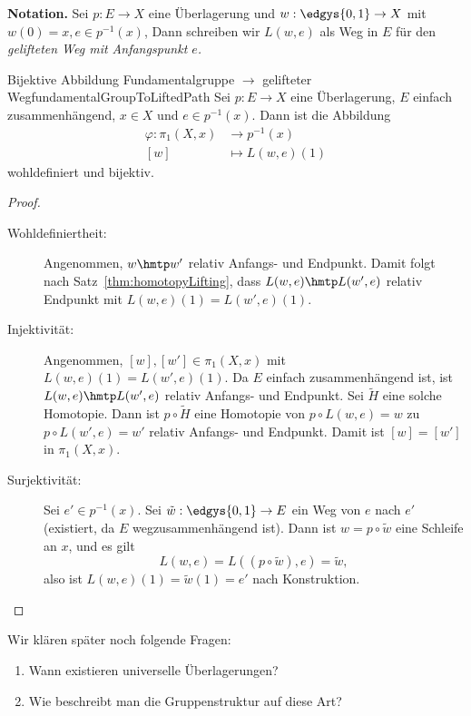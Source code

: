 \documentclass[language=ngerman]{TemplateLecture} %
\begin{document}
\textbf{Notation.} Sei $p: E \to X$ eine Überlagerung und $w: \edgys{0,1} \to X$ mit $w(0) = x, e \in p^{-1}(x)$, Dann schreiben wir $L(w,e)$ als Weg in $E$ für den \emph{gelifteten Weg mit Anfangspunkt $e$.}

\begin{thm}{Bijektive Abbildung Fundamentalgruppe $\to$ gelifteter Weg}{fundamentalGroupToLiftedPath}
    Sei $p: E \to X$ eine Überlagerung, $E$ einfach zusammenhängend, $x \in X$ und $e \in p^{-1}(x)$. Dann ist die Abbildung
    \begin{align*}
        \varphi: \pi_1(X,x) &\longrightarrow p^{-1}(x) \\
        [w] &\longmapsto L(w,e)(1)
    \end{align*}
    wohldefiniert und bijektiv.
\end{thm}

\begin{proof}
    \begin{description}
        \item[Wohldefiniertheit:] Angenommen, $w \hmtp w'$ relativ Anfangs- und Endpunkt. Damit folgt nach Satz~\ref{thm:homotopyLifting}, dass $L(w,e) \hmtp L(w', e)$ relativ Endpunkt mit $L(w,e)(1) = L(w',e)(1)$.
        \item[Injektivität:] Angenommen, $[w], [w'] \in \pi_1(X,x)$ mit $L(w,e)(1) = L(w',e)(1)$. Da $E$ einfach zusammenhängend ist, ist $L(w,e) \hmtp L(w',e)$ relativ Anfangs- und Endpunkt. Sei $\tilde{H}$ eine solche Homotopie. Dann ist $p \circ \tilde{H}$ eine Homotopie von $p \circ L(w,e) = w$ zu $p \circ L(w',e) = w'$ relativ Anfangs- und Endpunkt. Damit ist $[w] = [w']$ in $\pi_1(X,x)$.
        \item[Surjektivität:] Sei $e' \in p^{-1}(x)$. Sei $\tilde{w}: \edgys{0,1} \to E$ ein Weg von $e$ nach $e'$ (existiert, da $E$ wegzusammenhängend ist). Dann ist $w = p \circ \tilde{w}$ eine Schleife an $x$, und es gilt 
        \begin{equation*}
            L(w,e) = L((p \circ \tilde{w}),e) = \tilde{w},
        \end{equation*}
        also ist $L(w, e)(1) = \tilde{w}(1) = e'$ nach Konstruktion.
    \end{description}
\end{proof}

Wir klären später noch folgende Fragen:
\begin{enumerate}
    \item Wann existieren universelle Überlagerungen?
    \item Wie beschreibt man die Gruppenstruktur auf diese Art?
\end{enumerate}
\end{document}
